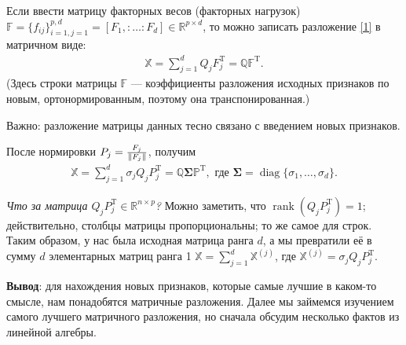 \documentclass[specialist, 12pt,
subf, %
href, colorlinks=true,
substylefile = spbu.rtx,
]{disser}
\newtheorem{proposition}{Предложение}
\DeclareMathOperator{\diag}{diag}
\DeclareMathOperator{\rnk}{rank}
\begin{document}
	Если ввести матрицу факторных весов (факторных нагрузок) $\mathbb{F} = \{f_{ij}\}_{i = 1, j = 1}^{p,d}= [F_1,:\ldots:F_d] \in \mathbb{R}^{p \times d}$, то можно записать разложение \eqref{1} в матричном виде:
\begin{gather}\label{2}
\mathbb{X} = \sum\limits_{j = 1}^d Q_j F_j^{\mathrm{T}} = \mathbb{Q}\mathbb{F}^{\mathrm{T}}.
\end{gather}
(Здесь строки матрицы $\mathbb{F}$ --- коэффициенты разложения исходных признаков по новым, ортонормированным, поэтому она транспонированная.)

Важно: разложение матрицы данных тесно связано с введением новых признаков. 

После нормировки $P_j = \frac{F_j}{\Arrowvert F_j\Arrowvert}$, получим
\begin{gather}\label{3}
\mathbb{X} = \sum\limits_{j = 1}^d \sigma_j Q_j P_j^{\mathrm{T}} = \mathbb{Q} \mathbf{\bm\Sigma} \mathbb{P}^{\mathrm{T}}, \text{ где $\mathbf{\bm\Sigma} = \diag\{\sigma_1, \ldots, \sigma_d\}$.}
\end{gather}

%
\textit{Что за матрица $Q_jP_j^{\mathrm{T}} \in \mathbb{R}^{n \times p}$?} Можно заметить, что $\rnk(Q_jP_j^{\mathrm{T}}) = 1$; действительно, столбцы матрицы пропорциональны; то же самое для строк. Таким образом, у нас была исходная матрица ранга $d$, а мы превратили её в сумму $d$ элементарных матриц ранга 1 $\mathbb{X} = \sum\limits_{j = 1}^d \mathbb{X}^{(j)}$, где $\mathbb{X}^{(j)} = \sigma_jQ_jP_j^{\mathrm{T}}$. 

\textbf{Вывод}: для нахождения новых признаков, которые самые лучшие в каком-то смысле, нам понадобятся матричные разложения. Далее мы займемся изучением самого лучшего матричного разложения, но сначала обсудим несколько фактов из линейной алгебры. 

\end{document}
